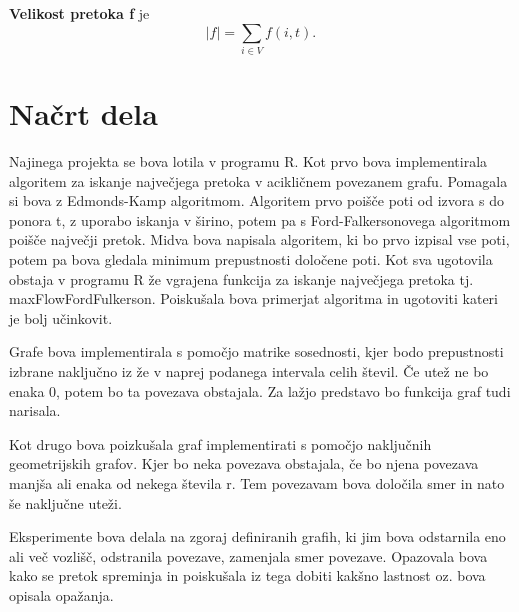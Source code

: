 \documentclass[a4paper]{article}
\begin{document}
\textbf{Velikost pretoka f} je $$|f|= \sum_{i \in V} f(i,t). $$


\section{Načrt dela}

Najinega projekta se bova lotila v programu R. Kot prvo bova implementirala algoritem za iskanje največjega pretoka v acikličnem povezanem grafu. Pomagala si  bova z Edmonds-Kamp algoritmom. Algoritem prvo poišče poti od izvora s do ponora t, z uporabo iskanja v širino, potem pa s  Ford-Falkersonovega algoritmom poišče največji pretok. Midva bova napisala algoritem, ki bo prvo izpisal vse poti, potem pa bova gledala minimum prepustnosti določene poti. Kot sva ugotovila obstaja v programu R že vgrajena funkcija za iskanje največjega pretoka tj. maxFlowFordFulkerson. Poiskušala bova primerjat algoritma in ugotoviti kateri je bolj učinkovit. 

Grafe bova implementirala s pomočjo matrike sosednosti, kjer bodo prepustnosti izbrane naključno iz že v naprej podanega intervala celih števil. Če utež ne bo enaka 0, potem bo ta povezava obstajala. Za lažjo predstavo bo funkcija graf tudi narisala. 

Kot drugo bova poizkušala graf implementirati s pomočjo naključnih geometrijskih grafov. Kjer bo neka povezava obstajala, če bo njena povezava manjša ali enaka od nekega števila r. Tem povezavam bova določila smer in nato še naključne uteži.

Eksperimente bova delala na zgoraj definiranih grafih, ki jim bova odstarnila eno ali več vozlišč, odstranila povezave, zamenjala smer povezave. Opazovala bova kako se pretok spreminja in poiskušala iz tega dobiti kakšno lastnost oz. bova opisala opažanja. 
\end{document}

